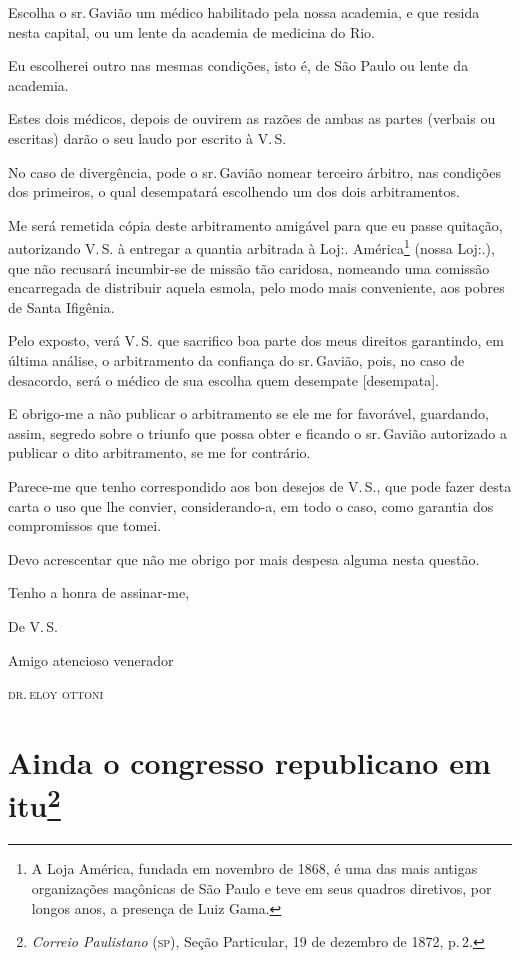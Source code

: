 Escolha o sr.\,Gavião um médico habilitado pela nossa academia, e que
resida nesta capital, ou um lente da academia de medicina do Rio.

Eu escolherei outro nas mesmas condições, isto é, de São Paulo ou lente
da academia.

Estes dois médicos, depois de ouvirem as razões de ambas as partes
(verbais ou escritas) darão o seu laudo por escrito à V.\,S.

No caso de divergência, pode o sr.\,Gavião nomear terceiro árbitro, nas
condições dos primeiros, o qual desempatará escolhendo um dos dois
arbitramentos.

Me será remetida cópia deste arbitramento amigável para que eu passe
quitação, autorizando V.\,S. à entregar a quantia arbitrada à Loj:.
América\footnote{ A Loja América, fundada em novembro de 1868, é uma
  das mais antigas organizações maçônicas de São Paulo e teve em seus
  quadros diretivos, por longos anos, a presença de Luiz Gama.} (nossa
Loj:.), que não recusará incumbir-se de missão tão caridosa, nomeando
uma comissão encarregada de distribuir aquela esmola, pelo modo mais
conveniente, aos pobres de Santa Ifigênia.

Pelo exposto, verá V.\,S. que sacrifico boa parte dos meus direitos
garantindo, em última análise, o arbitramento da confiança do sr.\,Gavião, pois, no caso de desacordo, será o médico de sua escolha quem
desempate {[}desempata{]}.

E obrigo-me a não publicar o arbitramento se ele me for favorável,
guardando, assim, segredo sobre o triunfo que possa obter e ficando o
sr.\,Gavião autorizado a publicar o dito arbitramento, se me for
contrário.

Parece-me que tenho correspondido aos bon desejos de V.\,S., que pode
fazer desta carta o uso que lhe convier, considerando-a, em todo o caso,
como garantia dos compromissos que tomei.

Devo acrescentar que não me obrigo por mais despesa alguma nesta
questão.

Tenho a honra de assinar-me,

\begin{flushright}
De V.\,S.

Amigo atencioso venerador

\textsc{dr.\,eloy ottoni}
\end{flushright}

\chapter{Ainda o congresso republicano em itu\footnote{\emph{Correio Paulistano} (\textsc{sp}), Seção Particular,
  19 de dezembro de 1872, p.\,2.}} %

